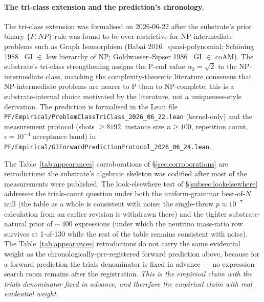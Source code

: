 \documentclass[11pt,a4paper]{amsart}
\theoremstyle{plain}
\theoremstyle{definition}
\begin{document}
\paragraph{The tri-class extension and the prediction's chronology.} The tri-class extension was formalised on 2026-06-22 after the substrate's prior binary $\{P, NP\}$ rule was found to be over-restrictive for NP-intermediate problems such as Graph Isomorphism (Babai 2016~\cite{babai2016} quasi-polynomial; Sch\"oning 1988~\cite{schoning1988} GI $\in$ low hierarchy of NP; Goldwasser--Sipser 1986~\cite{goldwasser1986} GI $\in$ coAM). The substrate's tri-class strengthening assigns the P-end value $\alpha_3 = \sqrt{2}$ to the NP-intermediate class, matching the complexity-theoretic literature consensus that NP-intermediate problems are nearer to P than to NP-complete; this is a substrate-internal choice motivated by the literature, not a uniqueness-style derivation. The prediction is formalised in the Lean file \texttt{PF/Empirical/ProblemClassTriClass\_2026\_06\_22.lean} (kernel-only) and the measurement protocol (shots $\geq 8192$, instance size $n \geq 100$, repetition count, $\epsilon = 10^{-4}$ acceptance band) in \texttt{PF/Empirical/GIForwardPredictionProtocol\_2026\_06\_24.lean}.

The Table~\ref{tab:appearances} corroborations of \S\ref{sec:corroborations} are retrodictions: the substrate's algebraic skeleton was codified after most of the measurements were published. The look-elsewhere test of \S\ref{subsec:lookelsewhere} addresses the trials-count question under both the uniform-grammar best-of-$N$ null (the table as a whole is consistent with noise; the single-throw $p \approx 10^{-7}$ calculation from an earlier revision is withdrawn there) and the tighter substrate-natural prior of $\sim$\,400 expressions (under which the neutrino mass-ratio row survives at 1-of-130 while the rest of the table remains consistent with noise). The Table~\ref{tab:appearances} retrodictions do not carry the same evidential weight as the chronologically-pre-registered forward prediction above, because for a forward prediction the trials denominator is fixed in advance --- no expression-search room remains after the registration. \emph{This is the empirical claim with the trials denominator fixed in advance, and therefore the empirical claim with real evidential weight.}
\end{document}
